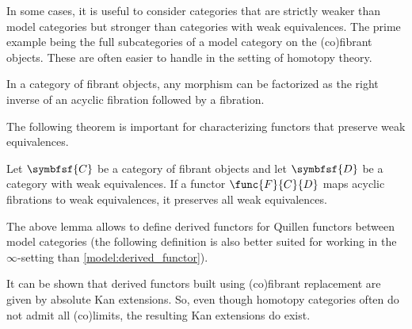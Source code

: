     In some cases, it is useful to consider categories that are strictly weaker than model categories but stronger than categories with weak equivalences. The prime example being the full subcategories of a model category on the (co)fibrant objects. These are often easier to handle in the setting of homotopy theory.

    \begin{theorem}
        In a category of fibrant objects, any morphism can be factorized as the right inverse of an acyclic fibration followed by a fibration.
    \end{theorem}

    The following theorem is important for characterizing functors that preserve weak equivalences.
    \begin{theorem}\label{model:ken_brown}
        Let $\symbfsf{C}$ be a category of fibrant objects and let $\symbfsf{D}$ be a category with weak equivalences. If a functor $\func{F}{C}{D}$ maps acyclic fibrations to weak equivalences, it preserves all weak equivalences.
    \end{theorem}

    The above lemma allows to define derived functors for Quillen functors between model categories (the following definition is also better suited for working in the $\infty$-setting than \cref{model:derived_functor}).
    \begin{property}\label{model:absolute_derived_functors}
        It can be shown that derived functors built using (co)fibrant replacement are given by absolute Kan extensions. So, even though homotopy categories often do not admit all (co)limits, the resulting Kan extensions do exist.
    \end{property}

